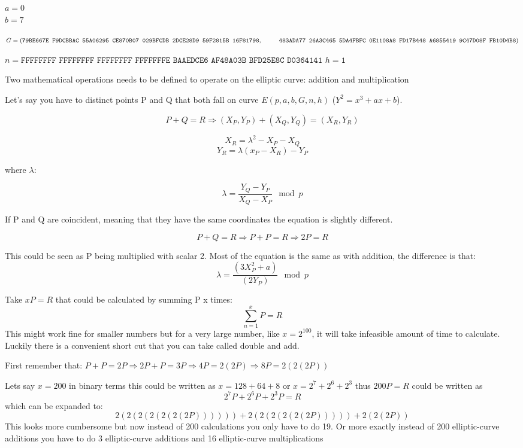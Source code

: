 $a=0$\\
$b=7$

$G=(\texttt{79BE667E F9DCBBAC 55A06295 CE870B07 029BFCDB 2DCE28D9 59F2815B 16F81798},\\ \null\qquad\:\:\: 
\texttt{483ADA77 26A3C465 5DA4FBFC 0E1108A8 FD17B448 A6855419 9C47D08F FB10D4B8})$


$n=\texttt{FFFFFFFF FFFFFFFF FFFFFFFF FFFFFFFE BAAEDCE6 AF48A03B BFD25E8C D0364141}$
$h=\texttt{1}$

Two mathematical operations needs to be defined to operate on the elliptic curve: 
addition and multiplication

Let's say you have to distinct points P and Q that both fall on curve $E(p,a,b,G,n,h)$ 
($Y^2=x^3+ax+b$). 

$$P+Q=R \Rightarrow (X_P, Y_P) + (X_Q, Y_Q) = (X_R, Y_R)$$

$$X_R = \lambda^2-X_P-X_Q$$
$$Y_R = \lambda(x_P-X_R) -Y_P$$

where $\lambda$:

$$\lambda = \frac{Y_Q-Y_P}{X_Q - X_P} \mod p$$

If P and Q are coincident, meaning that they have the same coordinates the equation 
is slightly different. 

$$P+Q=R \Rightarrow P+P=R \Rightarrow 2P=R$$ 

This could be seen as P being multiplied with scalar 2. Most of the equation is the same 
as with addition, the difference is that:\\
$$\lambda = \frac{(3X^2_P + a)}{(2Y_P)} \mod p$$

Take $xP=R$ that could be calculated by summing P x times:
$$\sum_{n=1}^{x} P = R$$
This might work fine for smaller numbers but for a very large number, like $x=2^{100}$, it will 
take infeasible amount of time to calculate. Luckily there is a convenient short cut that you 
can take called double and add. 

First remember that: $P+P = 2P \Rightarrow 2P + P = 3P \Rightarrow 4P = 2(2P) \Rightarrow 8P = 2(2(2P))$

Lets say $x=200$ in binary terms this could be written as $x=128+64+8$ or $x=2^7+2^6+2^3$ 
thus $200P=R$ could be written as 
$$2^7P+2^6P+2^3P=R$$ 
which can be expanded to: 
$$2(2(2(2(2(2(2P)))))) + 2(2(2(2(2(2P))))) + 2(2(2P))$$ 
This looks more cumbersome but now instead of 200 calculations you only have to do 19. Or more exactly instead of 200 elliptic-curve additions you have to do 3 elliptic-curve additions and 16 elliptic-curve multiplications


